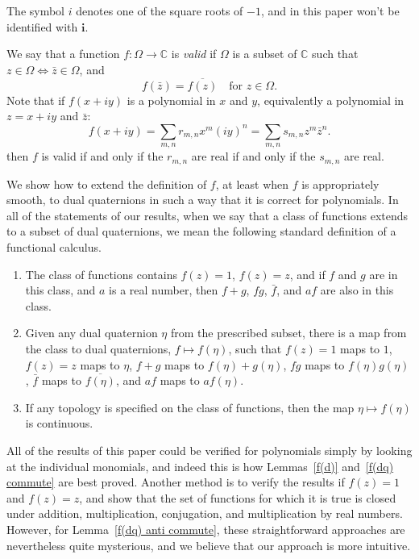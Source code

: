 \documentclass[12pt,reqno]{amsart}
\newcommand\bi{\bm i}
\begin{document}
The symbol $i$ denotes one of the square roots of $-1$, and in this paper won't be identified with $\bi$.

We say that a function $f:\Omega \to \mathbb C$ is \emph{valid} if $\Omega$ is a subset of $\mathbb C$ such that $z\in\Omega \Leftrightarrow \bar z \in \Omega$, and
\begin{equation}
f(\bar z) = \overline{f(z)} \quad \text{for $z \in \Omega$.}
\end{equation}
Note that if $f(x+iy)$ is a polynomial in $x$ and $y$, equivalently a polynomial in $z = x + i y$ and $\bar z$:
\begin{equation}
f(x+iy) = \sum_{m,n} r_{m,n} x^m (iy)^n = \sum_{m,n} s_{m,n} z^m \bar z^n.
\end{equation}
then $f$ is valid if and only if the $r_{m,n}$ are real if and only if the $s_{m,n}$ are real.

We show how to extend the definition of $f$, at least when $f$ is appropriately smooth, to dual quaternions in such a way that it is correct for polynomials.  In all of the statements of our results, when we say that a class of functions extends to a subset of dual quaternions, we mean the following standard definition of a functional calculus.
\begin{enumerate}
\item The class of functions contains $f(z) = 1$, $f(z) = z$, and if $f$ and $g$ are in this class, and $a$ is a real number, then $f+g$, $fg$, $\bar f$, and $a f$ are also in this class.
\item Given any dual quaternion $\eta$ from the prescribed subset, there is a map from the class to dual quaternions, $f \mapsto f(\eta)$, such that $f(z) = 1$ maps to $1$, $f(z) = z$ maps to $\eta$, $f+g$ maps to $f(\eta) + g(\eta)$, $fg$ maps to $f(\eta) g(\eta)$, $\bar f$ maps to $\overline{f(\eta)}$, and $a f$ maps to $a f(\eta)$.
\item \label{compact} If any topology is specified on the class of functions, then the map $\eta \mapsto f(\eta)$ is continuous.
\end{enumerate}
All of the results of this paper could be verified for polynomials simply by looking at the individual monomials, and indeed this is how Lemmas~\ref{f(d)} and~\ref{f(dq) commute} are best proved.  Another method is to verify the results if $f(z) = 1$ and $f(z) = z$, and show that the set of functions for which it is true is closed under addition, multiplication, conjugation, and multiplication by real numbers.  However, for Lemma~\ref{f(dq) anti commute}, these straightforward approaches are nevertheless quite mysterious, and we believe that our approach is more intuitive.
\end{document}
